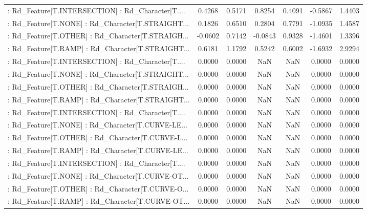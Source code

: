\begin{longtable}{p{4cm}cccccc}
 : Rd\_Feature[T.INTERSECTION] : Rd\_Character[T.... &  0.4268 &    0.5171 &  0.8254 &       0.4091 & -0.5867 &  1.4403 \\
 : Rd\_Feature[T.NONE] : Rd\_Character[T.STRAIGHT... &  0.1826 &    0.6510 &  0.2804 &       0.7791 & -1.0935 &  1.4587 \\
 : Rd\_Feature[T.OTHER] : Rd\_Character[T.STRAIGH... & -0.0602 &    0.7142 & -0.0843 &       0.9328 & -1.4601 &  1.3396 \\
 : Rd\_Feature[T.RAMP] : Rd\_Character[T.STRAIGHT... &  0.6181 &    1.1792 &  0.5242 &       0.6002 & -1.6932 &  2.9294 \\
 : Rd\_Feature[T.INTERSECTION] : Rd\_Character[T.... &  0.0000 &    0.0000 &     NaN &          NaN &  0.0000 &  0.0000 \\
 : Rd\_Feature[T.NONE] : Rd\_Character[T.STRAIGHT... &  0.0000 &    0.0000 &     NaN &          NaN &  0.0000 &  0.0000 \\
 : Rd\_Feature[T.OTHER] : Rd\_Character[T.STRAIGH... &  0.0000 &    0.0000 &     NaN &          NaN &  0.0000 &  0.0000 \\
 : Rd\_Feature[T.RAMP] : Rd\_Character[T.STRAIGHT... &  0.0000 &    0.0000 &     NaN &          NaN &  0.0000 &  0.0000 \\
 : Rd\_Feature[T.INTERSECTION] : Rd\_Character[T.... &  0.0000 &    0.0000 &     NaN &          NaN &  0.0000 &  0.0000 \\
 : Rd\_Feature[T.NONE] : Rd\_Character[T.CURVE-LE... &  0.0000 &    0.0000 &     NaN &          NaN &  0.0000 &  0.0000 \\
 : Rd\_Feature[T.OTHER] : Rd\_Character[T.CURVE-L... &  0.0000 &    0.0000 &     NaN &          NaN &  0.0000 &  0.0000 \\
 : Rd\_Feature[T.RAMP] : Rd\_Character[T.CURVE-LE... &  0.0000 &    0.0000 &     NaN &          NaN &  0.0000 &  0.0000 \\
 : Rd\_Feature[T.INTERSECTION] : Rd\_Character[T.... &  0.0000 &    0.0000 &     NaN &          NaN &  0.0000 &  0.0000 \\
 : Rd\_Feature[T.NONE] : Rd\_Character[T.CURVE-OT... &  0.0000 &    0.0000 &     NaN &          NaN &  0.0000 &  0.0000 \\
 : Rd\_Feature[T.OTHER] : Rd\_Character[T.CURVE-O... &  0.0000 &    0.0000 &     NaN &          NaN &  0.0000 &  0.0000 \\
 : Rd\_Feature[T.RAMP] : Rd\_Character[T.CURVE-OT... &  0.0000 &    0.0000 &     NaN &          NaN &  0.0000 &  0.0000 \\

\end{longtable}
